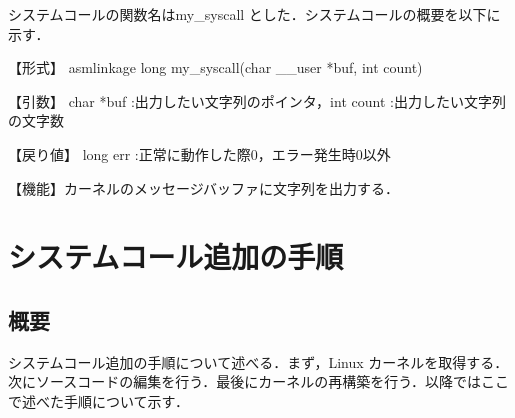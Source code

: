 \documentclass[12pt]{jsarticle}
\begin{document}
システムコールの関数名はmy\_syscall とした．システムコールの概要を以下に示す．

【形式】 asmlinkage long my\_syscall(char \_\_user *buf, int count)

【引数】 char *buf :出力したい文字列のポインタ，int count :出力したい文字列の文字数

【戻り値】 long err :正常に動作した際0，エラー発生時0以外

【機能】カーネルのメッセージバッファに文字列を出力する．

\section{システムコール追加の手順}\label{sec:tejun}
 \subsection{概要}
システムコール追加の手順について述べる．まず，Linux カーネルを取得する．次にソースコードの編集を行う．最後にカーネルの再構築を行う．以降ではここで述べた手順について示す．
\end{document}
